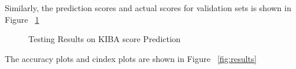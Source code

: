 Similarly, the prediction scores and actual scores for validation sets is shown in Figure ~\ref{fig:val_train}
\begin{figure}[H]
    \caption{Testing Results on KIBA score Prediction}
    \label{fig:val_train}
\end{figure}

\iffalse
The accuracy plots and cindex plots are shown in Figure ~\ref{fig:results}
\begin{figure}
    
\end{figure}


